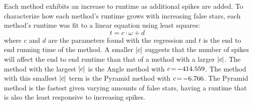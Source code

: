 %
%
%
Each method exhibits an increase to runtime as additional spikes are added.
To characterize how each method's runtime grows with increasing false stars, each method's runtime was fit to a linear
equation using least squares:
\begin{equation}
    t = c\cdot\omega + d
\end{equation}
where $c$ and $d$ are the parameters found with the regression and $t$ is the end to end running time of the method.
A smaller $\left| c \right|$ suggests that the number of spikes will affect the end to end runtime than that of a method with a
larger $\left| c \right|$.
The method with the largest $\left| c \right|$ is the Angle method with $c \!=\! -414.559$.
The method with this smallest $\left| c \right|$ term is the Pyramid method with $c \!=\! -6.766$.
The Pyramid method is the fastest given varying amounts of false stars, having a runtime that is also the least
responsive to increasing spikes.


